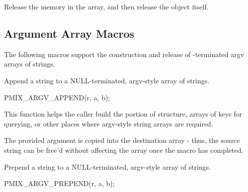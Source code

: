 Release the memory in the array, and then release the  object itself.


\begin{arglist}
\end{arglist}

\subsection{Argument Array Macros}

The following macros support the construction and release of -terminated argv arrays of strings.


Append a string to a NULL-terminated, argv-style array of strings.

\cspecificstart
\begin{codepar}
PMIX_ARGV_APPEND(r, a, b);
\end{codepar}
\cspecificend

\begin{arglist}
\end{arglist}

This function helps the caller build the  portion of  structure, arrays of keys for querying, or other places where argv-style string arrays are required.

\adviceuserstart
The provided argument is copied into the destination array - thus, the source string can be free'd without affecting the array once the macro has completed.
\adviceuserend


Prepend a string to a NULL-terminated, argv-style array of strings.

\cspecificstart
\begin{codepar}
PMIX_ARGV_PREPEND(r, a, b);
\end{codepar}
\cspecificend

